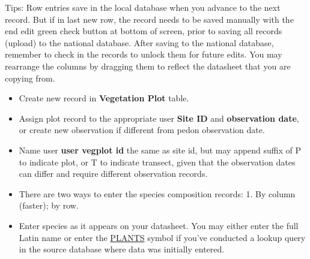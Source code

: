 \documentclass[
]{book}
\begin{document}
Tips: Row entries save in the local database when you advance to the next record. But if in last new row, the record needs to be saved manually with the end edit green check button at bottom of screen, prior to saving all records (upload) to the national database. After saving to the national database, remember to check in the records to unlock them for future edits. You may rearrange the columns by dragging them to reflect the datasheet that you are copying from.

\begin{itemize}
\item
  Create new record in \textbf{Vegetation Plot} table.
\item
  Assign plot record to the appropriate user \textbf{Site ID} and \textbf{observation date}, or create new observation if different from pedon observation date.
\item
  Name user \textbf{user vegplot id} the same as site id, but may append suffix of P to indicate plot, or T to indicate transect, given that the observation dates can differ and require different observation records.
\item
  There are two ways to enter the species composition records: 1. By column (faster); by row.
\item
  Enter species as it appears on your datasheet. You may either enter the full Latin name or enter the \href{https://plants.usda.gov/}{PLANTS} symbol if you've conducted a lookup query in the source database where data was initially entered.


\end{itemize}
\end{document}
